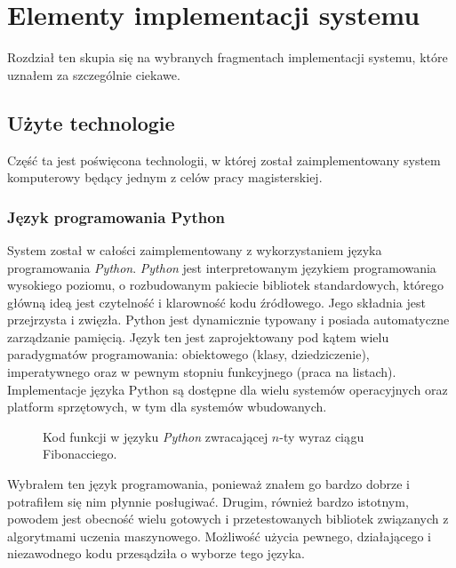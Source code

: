 \documentclass[../thesis.tex]{subfiles}
\begin{document}
\pagestyle{plain}
\chapter{Elementy implementacji systemu}

Rozdział ten skupia się na wybranych fragmentach implementacji systemu, które uznałem za szczególnie ciekawe.

\section{Użyte technologie}

Część ta jest poświęcona technologii, w której został zaimplementowany system komputerowy będący jednym z celów pracy magisterskiej.

\subsection{Język programowania Python}

System został w całości zaimplementowany z wykorzystaniem języka programowania \emph{Python}. \emph{Python} jest interpretowanym językiem programowania wysokiego poziomu, o rozbudowanym pakiecie bibliotek standardowych, którego główną ideą jest czytelność i klarowność kodu źródłowego. Jego składnia jest przejrzysta i zwięzła. Python jest dynamicznie typowany i posiada automatyczne zarządzanie pamięcią. Język ten jest zaprojektowany pod kątem wielu paradygmatów programowania: obiektowego (klasy, dziedziczenie), imperatywnego oraz w pewnym stopniu funkcyjnego (praca na listach). Implementacje języka Python są dostępne dla wielu systemów operacyjnych oraz platform sprzętowych, w tym dla systemów wbudowanych.

\begin{figure}[h]
\centering
{}

\caption{Kod funkcji w języku \emph{Python} zwracającej $n$-ty wyraz ciągu Fibonacciego.}
\label{impl:snippet_python}
\end{figure}

Wybrałem ten język programowania, ponieważ znałem go bardzo dobrze i potrafiłem się nim płynnie posługiwać. Drugim, również bardzo istotnym, powodem jest obecność wielu gotowych i przetestowanych bibliotek związanych z algorytmami uczenia maszynowego. Możliwość użycia pewnego, działającego i niezawodnego kodu przesądziła o wyborze tego języka.
\end{document}
